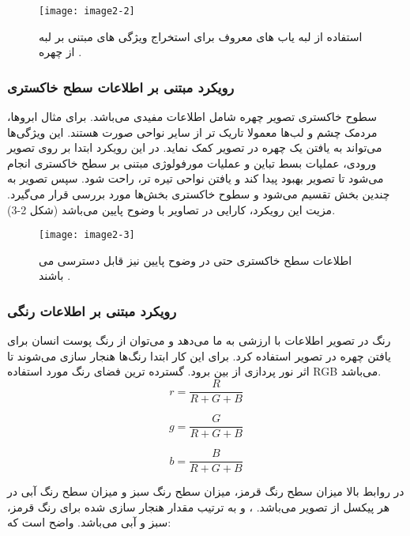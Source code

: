 \begin{figure}[h]
\centering
  \texttt{[image: image2-2]}
  \caption{استفاده از لبه یاب های معروف برای استخراج ویژگی های مبتنی بر لبه از چهره  \cite{ref1}.}
  \label{image2-2}
\end{figure}

\subsubsection{رویکرد مبتنی بر اطلاعات سطح خاکستری} 
سطوح خاکستری  تصویر چهره شامل اطلاعات مفیدی می‌باشد. برای مثال ابرو‌ها، مردمک چشم و لب‌ها معمولا تاریک تر از سایر نواحی صورت هستند. این ویژگی‌ها می‌تواند به یافتن یک چهره در تصویر کمک نماید. در این رویکرد ابتدا بر روی تصویر ورودی، عملیات بسط تباین  و عملیات مورفولوژی  مبتنی بر سطح خاکستری انجام می‌شود تا تصویر بهبود پیدا کند و یافتن نواحی تیره تر، راحت شود. سپس تصویر به چندین بخش تقسیم می‌شود و سطوح خاکستری بخش‌ها مورد بررسی قرار می‌گیرد. مزیت این رویکرد، کارایی در تصاویر با وضوح پایین می‌باشد (شکل 2-3).

\begin{figure}[h]
\centering
  \texttt{[image: image2-3]}
  \caption{اطلاعات سطح خاکستری حتی در وضوح پایین نیز قابل دسترسی می باشند  \cite{ref1}.}
  \label{image2-3}
\end{figure}

\subsubsection{رویکرد مبتنی بر اطلاعات رنگی}
رنگ در تصویر اطلاعات با ارزشی به ما می‌دهد و می‌توان از رنگ پوست انسان برای یافتن چهره در تصویر استفاده کرد. برای این کار ابتدا رنگ‌ها هنجار سازی  می‌شوند تا اثر نور پردازی از بین برود. گسترده ترین فضای رنگ مورد استفاده RGB می‌باشد.
\begin{equation}\label{eq2-1}
r = \frac{R}{R + G + B}
\end{equation}

\begin{equation}\label{eq2-2}
g = \frac{G}{R + G + B}
\end{equation}

\begin{equation}\label{eq2-3}
b = \frac{B}{R + G + B}
\end{equation}

در روابط بالا  میزان سطح رنگ قرمز،  میزان سطح رنگ سبز و  میزان سطح رنگ آبی در هر پیکسل از تصویر می‌باشد. 
، 
و
به ترتیب مقدار هنجار سازی شده برای رنگ قرمز، سبز و آبی می‌باشد. واضح است که:
    
